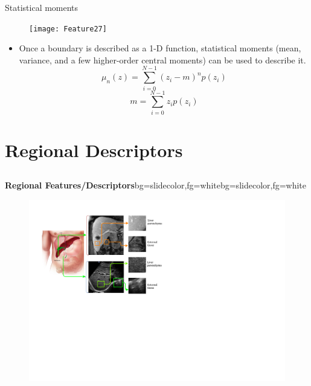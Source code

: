 \begin{frame}{Statistical moments}
\vspace{-4pt}
\begin{figure}
\texttt{[image: Feature27]}
\end{figure}
\begin{itemize}
\item Once a boundary is described as a 1-D function, {\color{mycolor2}statistical moments} (mean, variance, and a few higher-order central moments) can be used to describe it.
\[\boxed{{\mu _n}(z) = \sum\limits_{i = 0}^{N - 1} {{{({z_i} - m)}^n}p({z_i})}} \]
\[\boxed{m = \sum\limits_{i = 0}^{N - 1} {{z_i}p({z_i})}} \]

\end{itemize}
\end{frame}

\section{Regional Descriptors}
\subsection{}

\begin{frame}{}
\begin{variableblock}{\centering \Large \textbf{\vspace{4pt}\newline Regional Features/Descriptors\vspace{4pt}}}{bg=slidecolor,fg=white}{bg=slidecolor,fg=white}
\end{variableblock}
\begin{figure}
\centering
\includegraphics[scale=0.6]{Figures/FE008}
\end{figure}
\end{frame}

